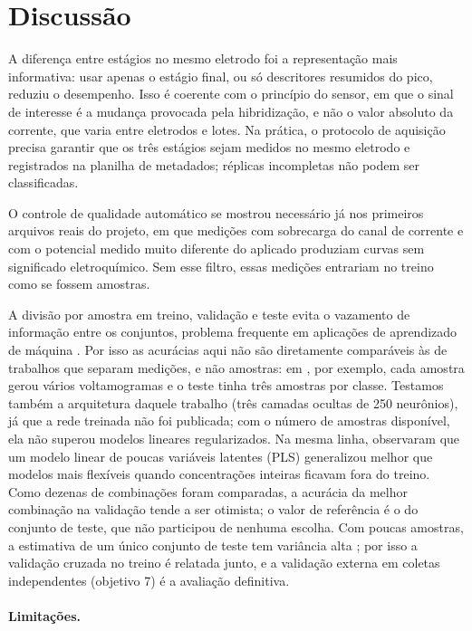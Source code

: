 \section{Discussão}

A diferença entre estágios no mesmo eletrodo foi a representação mais informativa: usar apenas o
estágio final, ou só descritores resumidos do pico, reduziu o desempenho. Isso é coerente com o
princípio do sensor, em que o sinal de interesse é a mudança provocada pela hibridização, e não o
valor absoluto da corrente, que varia entre eletrodos e lotes. Na prática, o protocolo de
aquisição precisa garantir que os três estágios sejam medidos no mesmo eletrodo e registrados na
planilha de metadados; réplicas incompletas não podem ser classificadas.

O controle de qualidade automático se mostrou necessário já nos primeiros arquivos reais do
projeto, em que medições com sobrecarga do canal de corrente e com o potencial medido muito
diferente do aplicado produziam curvas sem significado eletroquímico. Sem esse filtro, essas
medições entrariam no treino como se fossem amostras. 

A divisão por amostra em treino, validação e teste evita o vazamento de informação entre os
conjuntos, problema frequente em aplicações de aprendizado de máquina \citep{kapoor2023}. Por
isso as acurácias aqui não são diretamente comparáveis às de trabalhos que separam medições, e não
amostras: em \citet{aliev2024}, por exemplo, cada amostra gerou vários voltamogramas e o teste
tinha três amostras por classe. Testamos também a arquitetura daquele trabalho (três camadas
ocultas de 250 neurônios), já que a rede treinada não foi publicada; com o número de amostras
disponível, ela não superou modelos lineares regularizados. Na mesma linha, \citet{tian2026}
observaram que um modelo linear de poucas variáveis latentes (PLS) generalizou melhor que modelos
mais flexíveis quando concentrações inteiras ficavam fora do treino. Como
dezenas de combinações foram comparadas, a acurácia da melhor combinação na validação tende a ser
otimista; o valor de referência é o do conjunto de teste, que não participou de nenhuma escolha.
Com poucas amostras, a estimativa de um único conjunto de teste tem variância alta
\citep{vabalas2019}; por isso a validação cruzada no treino é relatada junto, e a validação externa
em coletas independentes (objetivo 7) é a avaliação definitiva.

\paragraph{Limitações.} 
